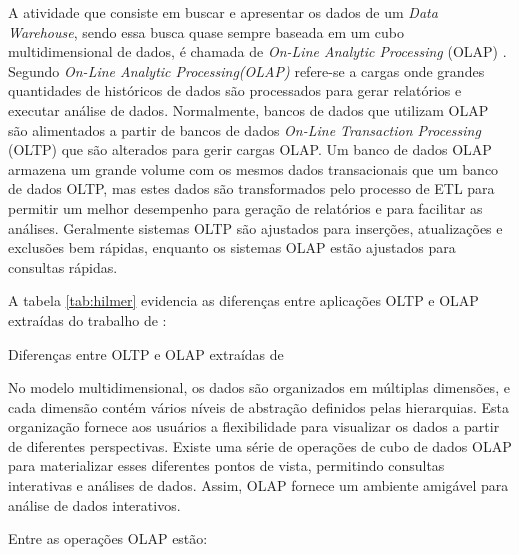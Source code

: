 A atividade que consiste em buscar e apresentar os dados de um \textit{Data Warehouse}, sendo essa busca quase sempre baseada em um cubo multidimensional de dados, é chamada de \textit{On-Line Analytic Processing} (OLAP) \cite{Kimball2002}. Segundo \cite{neeraj_sharma_2011} \textit{On-Line Analytic Processing(OLAP)} refere-se a cargas onde grandes quantidades de históricos de dados são processados para gerar relatórios e executar análise de dados. Normalmente, bancos de dados que utilizam OLAP são alimentados a partir de bancos de dados \textit{On-Line Transaction Processing} (OLTP) que são alterados para gerir cargas OLAP. Um banco de dados OLAP armazena um grande volume com os mesmos dados transacionais que um banco de dados OLTP, mas estes dados são transformados pelo processo de ETL para permitir um melhor desempenho para geração de relatórios e para facilitar as análises. Geralmente sistemas OLTP são ajustados para inserções, atualizações e exclusões bem rápidas, enquanto os sistemas OLAP estão ajustados para consultas rápidas.

A tabela \ref{tab:hilmer} evidencia as diferenças entre aplicações OLTP e OLAP extraídas do trabalho de : 

\begin{table}[!ht]
	\begin{center}
	
	 
	\caption{Diferenças entre OLTP e OLAP extraídas de }
	\label{tab:hilmer}
	\end{center}
	\end{table}	
	\FloatBarrier
	
	
No modelo multidimensional, os dados são organizados em múltiplas dimensões, e cada dimensão contém vários níveis de abstração definidos pelas hierarquias. Esta organização fornece aos usuários a flexibilidade para visualizar os dados a partir de diferentes perspectivas. Existe uma série de operações de cubo de dados OLAP para materializar esses diferentes pontos de vista, permitindo consultas interativas e análises de dados. Assim, OLAP fornece um ambiente amigável para análise de dados interativos.

Entre as operações OLAP estão:	


